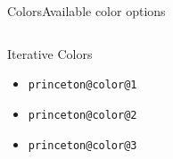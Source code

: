 \documentclass[aspectratio=169]{beamer}
\begin{document}
\begin{frame}[t]{Colors}{Available color options}
\begin{columns}[T]
    \begin{column}{.5\textwidth}
      \begin{block}{Iterative Colors}
        \begin{itemize}
        \item \textcolor{princeton@color@1}{\texttt{princeton@color@1}}
        \item \textcolor{princeton@color@2}{\texttt{princeton@color@2}}
        \item \textcolor{princeton@color@3}{\texttt{princeton@color@3}}
        \end{itemize}
      \end{block}
    \end{column}
  \end{columns}

\end{frame}
\end{document}
